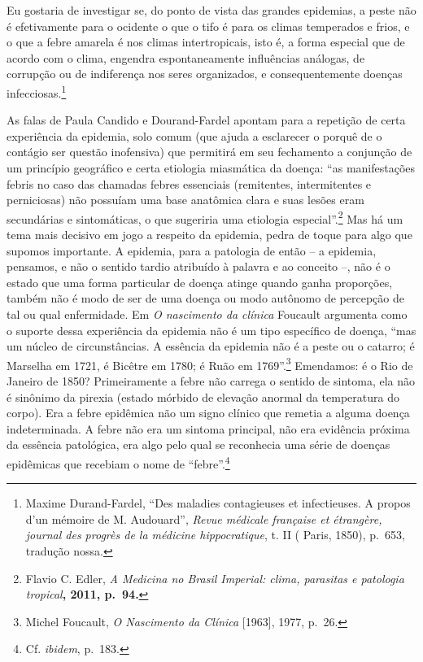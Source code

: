 Eu gostaria de investigar se, do ponto de vista das grandes epidemias, a
peste não é efetivamente para o ocidente o que o tifo é para os climas
temperados e frios, e o que a febre amarela é nos climas intertropicais,
isto é, a forma especial que de acordo com o clima, engendra
espontaneamente influências análogas, de corrupção ou de indiferença nos
seres organizados, e consequentemente doenças infecciosas.\footnote{Maxime
  Durand-Fardel, ``Des maladies contagieuses et infectieuses. A propos
  d'un mémoire de M. Audouard'', \emph{Revue médicale française et
  étrangère, journal des progrès de la médicine hippocratique}, t. II (
  Paris, 1850), p.~653, tradução nossa.}

As falas de Paula Candido e Dourand-Fardel apontam para a repetição de
certa experiência da epidemia, solo comum (que ajuda a esclarecer o
porquê de o contágio ser questão inofensiva) que permitirá em seu
fechamento a conjunção de um princípio geográfico e certa etiologia
miasmática da doença: ``as manifestações febris no caso das chamadas
febres essenciais (remitentes, intermitentes e perniciosas) não possuíam
uma base anatômica clara e suas lesões eram secundárias e sintomáticas,
o que sugeriria uma etiologia especial''.\footnote{Flavio C. Edler,
  \emph{A Medicina no Brasil Imperial: clima, parasitas e patologia
  tropical}\textbf{, 2011, p.~94.}} Mas há um tema mais decisivo em jogo
a respeito da epidemia, pedra de toque para algo que supomos importante.
A epidemia, para a patologia de então -- a epidemia, pensamos, e não o
sentido tardio atribuído à palavra e ao conceito --, não é o estado que
uma forma particular de doença atinge quando ganha proporções, também
não é modo de ser de uma doença ou modo autônomo de percepção de tal ou
qual enfermidade. Em \emph{O nascimento da clínica} Foucault argumenta
como o suporte dessa experiência da epidemia não é um tipo específico de
doença, ``mas um núcleo de circunstâncias. A essência da epidemia não é
a peste ou o catarro; é Marselha em 1721, é Bicêtre em 1780; é Ruão em
1769''.\footnote{Michel Foucault, \emph{O Nascimento da Clínica}
  {[}1963{]}, 1977, p.~26.} Emendamos: é o Rio de Janeiro de 1850?
Primeiramente a febre não carrega o sentido de sintoma, ela não é
sinônimo da pirexia (estado mórbido de elevação anormal da temperatura
do corpo). Era a febre epidêmica não um signo clínico que remetia a
alguma doença indeterminada. A febre não era um sintoma principal, não
era evidência próxima da essência patológica, era algo pelo qual se
reconhecia uma série de doenças epidêmicas que recebiam o nome de
``febre''.\footnote{Cf. \emph{ibidem}, p.~183.}

